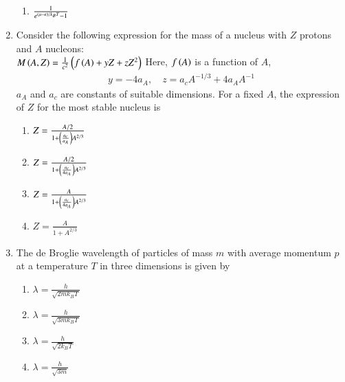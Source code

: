\documentclass[journal]{IEEEtran}
\numberwithin{equation}{enumi}
\numberwithin{figure}{enumi}
\begin{document}
\begin{enumerate}[start=25]
\begin{enumerate}
        \item $\frac{1}{e^{\left(\mu - \varepsilon\right) / k_B T} - 1}$
    \end{enumerate}
    \item Consider the following expression for the mass of a nucleus with $Z$ protons and $A$ nucleons:\\
    $
    M\left(A, Z\right) = \frac{1}{c^2} \left(f\left(A\right) + yZ + zZ^2\right)
    $
    Here, $f\left(A\right)$ is a function of $A$,
    \begin{align*}
    y = -4a_A, \quad z = a_c A^{-1/3} + 4a_A A^{-1}
    \end{align*}
    $a_A$ and $a_c$ are constants of suitable dimensions. For a fixed $A$, the expression of $Z$ for the most stable nucleus is
    \begin{enumerate}
        \item $Z = \frac{A / 2}{1 + \left(\frac{a_c}{a_A}\right) A^{2/3}}$
        \item $Z = \frac{A / 2}{1 + \left(\frac{a_c}{4a_A}\right) A^{2/3}}$
        \item $Z = \frac{A}{1 + \left(\frac{a_c}{4a_A}\right) A^{2/3}}$
        \item $Z = \frac{A}{1 + A^{2/3}}$
    \end{enumerate}
    \item The de Broglie wavelength of particles of mass $m$ with average momentum $p$ at a temperature $T$ in three dimensions is given by
    \begin{enumerate}
        \item $\lambda = \frac{h}{\sqrt{2mk_B T}}$
        \item $\lambda = \frac{h}{\sqrt{3mk_B T}}$
        \item $\lambda = \frac{h}{\sqrt{2k_B T}}$
        \item $\lambda = \frac{h}{\sqrt{3m}}$
    \end{enumerate}
\end{enumerate}
\end{document}
